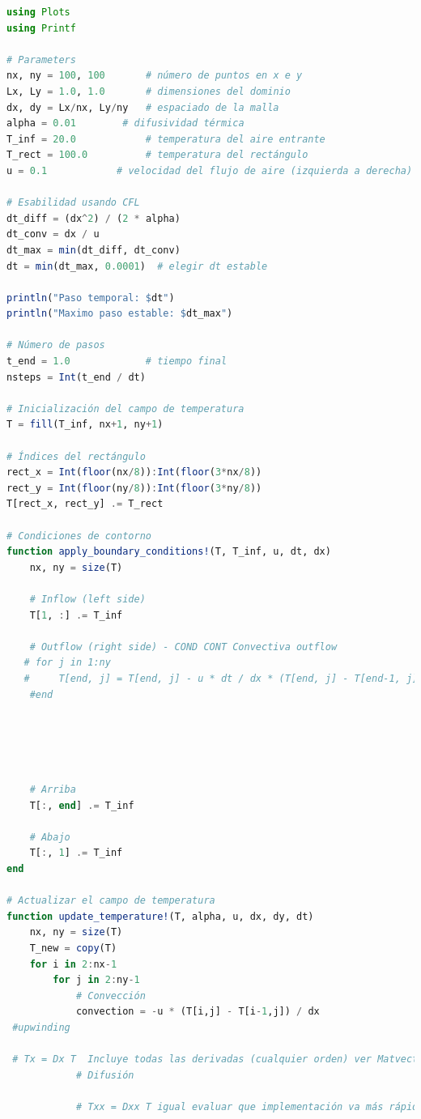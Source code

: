 \begin{lstlisting}[language=Julia]
using Plots
using Printf

# Parameters
nx, ny = 100, 100       # número de puntos en x e y
Lx, Ly = 1.0, 1.0       # dimensiones del dominio
dx, dy = Lx/nx, Ly/ny   # espaciado de la malla
alpha = 0.01        # difusividad térmica
T_inf = 20.0            # temperatura del aire entrante
T_rect = 100.0          # temperatura del rectángulo
u = 0.1            # velocidad del flujo de aire (izquierda a derecha)

# Esabilidad usando CFL 
dt_diff = (dx^2) / (2 * alpha)
dt_conv = dx / u
dt_max = min(dt_diff, dt_conv)
dt = min(dt_max, 0.0001)  # elegir dt estable

println("Paso temporal: $dt")
println("Maximo paso estable: $dt_max")

# Número de pasos
t_end = 1.0             # tiempo final
nsteps = Int(t_end / dt)

# Inicialización del campo de temperatura
T = fill(T_inf, nx+1, ny+1)

# Índices del rectángulo
rect_x = Int(floor(nx/8)):Int(floor(3*nx/8))
rect_y = Int(floor(ny/8)):Int(floor(3*ny/8))
T[rect_x, rect_y] .= T_rect

# Condiciones de contorno
function apply_boundary_conditions!(T, T_inf, u, dt, dx)
    nx, ny = size(T)
    
    # Inflow (left side)
    T[1, :] .= T_inf
    
    # Outflow (right side) - COND CONT Convectiva outflow 
   # for j in 1:ny
   #     T[end, j] = T[end, j] - u * dt / dx * (T[end, j] - T[end-1, j])
    #end
    
    



    # Arriba 
    T[:, end] .= T_inf
    
    # Abajo 
    T[:, 1] .= T_inf
end

# Actualizar el campo de temperatura
function update_temperature!(T, alpha, u, dx, dy, dt)
    nx, ny = size(T)
    T_new = copy(T)
    for i in 2:nx-1
        for j in 2:ny-1
            # Convección
            convection = -u * (T[i,j] - T[i-1,j]) / dx
 #upwinding
 
 # Tx = Dx T  Incluye todas las derivadas (cualquier orden) ver Matvect/ matmat// para ver comparación(tiempo y resultados) u*gradT
            # Difusión

            # Txx = Dxx T igual evaluar que implementación va más rápido Dxx la calculas una vez 


\end{lstlisting}

